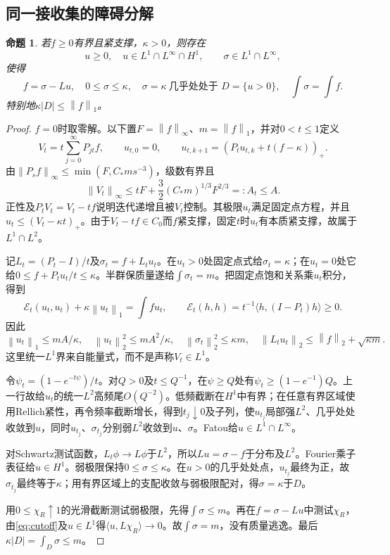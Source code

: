 \documentclass[UTF8,11pt,a4paper,fontset=fandol]{ctexart}
\newtheorem{proposition}[theorem]{命题}
\theoremstyle{definition}\newtheorem{definition}[theorem]{定义}
\theoremstyle{remark}\newtheorem{remark}[theorem]{注}
\newcommand{\norm}[1]{\left\lVert#1\right\rVert}
\newcommand{\abs}[1]{\left|#1\right|}
\newcommand{\pos}[1]{(#1)_+}
\begin{document}
\subsection{同一接收集的障碍分解}
\begin{proposition}\label{prop:obstacle}
若$f\ge0$有界且紧支撑，$\kappa>0$，则存在
\[
 u\ge0,\quad u\in L^1\cap L^\infty\cap H^1,
 \qquad \sigma\in L^1\cap L^\infty,
\]
使得
\begin{equation}\label{eq:obstacle}
 f=\sigma-Lu,\quad 0\le\sigma\le\kappa,
 \quad \sigma=\kappa\ \text{几乎处处于 }D=\{u>0\},
 \quad \int\sigma=\int f.
\end{equation}
特别地$\kappa\abs D\le\norm f_1$。
\end{proposition}
\begin{proof}
$f=0$时取零解。以下置$F=\norm f_\infty$、$m=\norm f_1$，并对$0<t\le1$定义
\[
 V_t=t\sum_{j=0}^\infty P_{jt}f,
 \qquad u_{t,0}=0,\qquad
 u_{t,k+1}=\pos{P_tu_{t,k}+t(f-\kappa)}.
\]
由$\norm{P_sf}_\infty\le\min(F,C_*ms^{-3})$，级数有界且
\begin{equation}\label{eq:Vbound}
 \norm{V_t}_\infty\le tF+\frac32(C_*m)^{1/3}F^{2/3}=:A_t\le A.
\end{equation}
正性及$P_tV_t=V_t-tf$说明迭代递增且被$V_t$控制。其极限$u_t$满足固定点方程，并且$u_t\le(V_t-\kappa t)_+$。由于$V_t-tf\in C_0$而$f$紧支撑，固定$t$时$u_t$有本质紧支撑，故属于$L^1\cap L^2$。

记$L_t=(P_t-I)/t$及$\sigma_t=f+L_tu_t$。在$u_t>0$处固定点式给$\sigma_t=\kappa$；在$u_t=0$处它给$0\le f+P_tu_t/t\le\kappa$。半群保质量遂给$\int\sigma_t=m$。把固定点饱和关系乘$u_t$积分，得到
\begin{equation}\label{eq:energy}
 \mathcal E_t(u_t,u_t)+\kappa\norm{u_t}_1=\int fu_t,
 \qquad \mathcal E_t(h,h)=t^{-1}\langle h,(I-P_t)h\rangle\ge0.
\end{equation}
因此
\[
 \norm{u_t}_1\le mA/\kappa,\quad
 \norm{u_t}_2^2\le mA^2/\kappa,\quad
 \norm{\sigma_t}_2^2\le\kappa m,\quad
 \norm{L_tu_t}_2\le\norm f_2+\sqrt{\kappa m}.
\]
这里统一$L^1$界来自能量式，而不是声称$V_t\in L^1$。

令$\psi_t=(1-e^{-t\psi})/t$。对$Q>0$及$t\le Q^{-1}$，在$\psi\ge Q$处有$\psi_t\ge(1-e^{-1})Q$。上一行故给$\widehat u_t$的统一$L^2$高频尾$O(Q^{-2})$。低频截断在$H^1$中有界；在任意有界区域使用Rellich紧性，再令频率截断增长，得到$t_j\downarrow0$及子列，使$u_{t_j}$局部强$L^2$、几乎处处收敛到$u$，同时$u_{t_j}$、$\sigma_{t_j}$分别弱$L^2$收敛到$u$、$\sigma$。Fatou给$u\in L^1\cap L^\infty$。

对Schwartz测试函数，$L_t\phi\to L\phi$于$L^2$，所以$Lu=\sigma-f$于分布及$L^2$。Fourier乘子表征给$u\in H^1$。弱极限保持$0\le\sigma\le\kappa$。在$u>0$的几乎处处点，$u_{t_j}$最终为正，故$\sigma_{t_j}$最终等于$\kappa$；用有界区域上的支配收敛与弱极限配对，得$\sigma=\kappa$于$D$。

用$0\le\chi_R\uparrow1$的光滑截断测试弱极限，先得$\int\sigma\le m$。再在$f=\sigma-Lu$中测试$\chi_R$，由\eqref{eq:cutoff}及$u\in L^1$得$\langle u,L\chi_R\rangle\to0$。故$\int\sigma=m$，没有质量逃逸。最后$\kappa\abs D=\int_D\sigma\le m$。
\end{proof}
\end{document}
